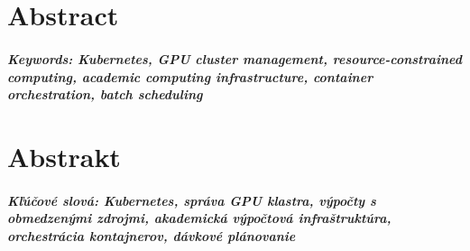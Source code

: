 \documentclass[12pt, twoside, openany]{book}
\begin{document}
\vfill\eject



\newpage
\thispagestyle{empty}
\chapter*{Abstract}\label{chap:abstract_en}


\paragraph*{Keywords: Kubernetes, GPU cluster management, resource-constrained computing, academic computing infrastructure, container orchestration, batch scheduling}


\newpage
\thispagestyle{empty}
\chapter*{Abstrakt}\label{chap:abstract_sk}


\paragraph*{Kľúčové slová: Kubernetes, správa GPU klastra, výpočty s obmedzenými zdrojmi, akademická výpočtová infraštruktúra, orchestrácia kontajnerov, dávkové plánovanie}




\newpage
\tableofcontents



\newpage
\listoffigures
\listoftables

% 


\mainmatter

% 
% 
% 
% 
% 
% 
% 
% 
% 
% 


%






\backmatter

\nocite{*}



\end{document}
